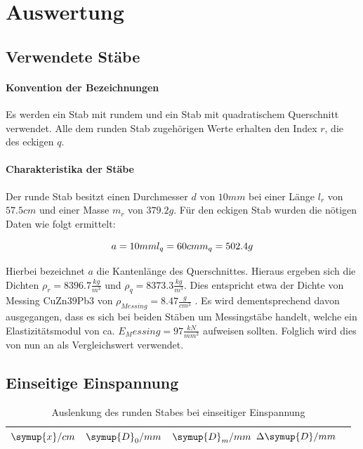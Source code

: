 \section{Auswertung}
\label{sec:Auswertung}

\subsection{Verwendete Stäbe}
\label{sec:Stäbe}
\paragraph{Konvention der Bezeichnungen}
\label{sec:Konvention}
Es werden ein Stab mit rundem und ein Stab mit quadratischem Querschnitt verwendet. Alle dem runden Stab zugehörigen Werte erhalten den Index $r$, die des eckigen $q$.

\paragraph{Charakteristika der Stäbe}
Der runde Stab besitzt einen Durchmesser $d$ von $10mm$ bei einer Länge $l_{r}$ von $57.5cm$ und einer Masse $m_{r}$ von $379.2g$.
Für den eckigen Stab wurden die nötigen Daten wie folgt ermittelt:

\begin{equation*}
  a = 10mm \\
  l_{q} = 60cm \\
  m_{q} = 502.4g \\
\end{equation*}

Hierbei bezeichnet $a$ die Kantenlänge des Querschnittes. Hieraus ergeben sich die Dichten $\rho_{r} = 8396.7\frac{kg}{m^3}$ und $\rho_{q} = 8373.3\frac{kg}{m^3}$. Dies entspricht etwa der Dichte von  Messing CuZn39Pb3 von $\rho_{Messing} = 8.47\frac{g}{cm^3}$ \cite{DKI}. Es wird dementsprechend davon ausgegangen, dass es sich bei beiden Stäben um Messingstäbe handelt, welche ein Elastizitätsmodul von ca. $E_Messing = 97 \frac{kN}{mm^3}$ \cite{DKI} aufweisen sollten. Folglich wird dies von nun an als Vergleichswert verwendet.

\subsection{Einseitige Einspannung}
\label{sec:Einseitig}

\begin{table}
  \centering
\caption{Auslenkung des runden Stabes bei einseitiger Einspannung}
\label{tab:rund}
\begin{tabular}{S S S S}
  \toprule
  {$\symup{x}/cm$} & {$\symup{D}_0/mm$} & {$\symup{D}_m/mm$} {$\Delta \symup{D}/mm$}\\
  \midrule
\bottomrule
\end{tabular}
\end{table}
\FloatBarrier

